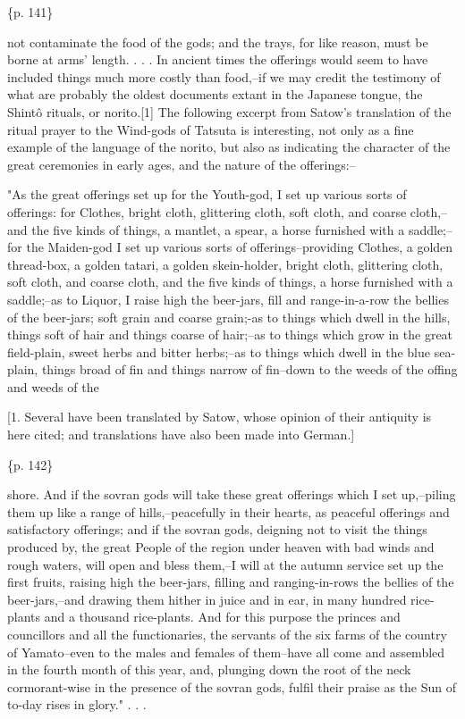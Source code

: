 \{p. 141\}

not contaminate the food of the gods; and the trays, for like reason, must be borne at arms' length. . . . In ancient times the offerings would seem to have included things much more costly than food,--if we may credit the testimony of what are probably the oldest documents extant in the Japanese tongue, the Shintô rituals, or norito.[1] The following excerpt from Satow's translation of the ritual prayer to the Wind-gods of Tatsuta is interesting, not only as a fine example of the language of the norito, but also as indicating the character of the great ceremonies in early ages, and the nature of the offerings:--

"As the great offerings set up for the Youth-god, I set up various sorts of offerings: for Clothes, bright cloth, glittering cloth, soft cloth, and coarse cloth,--and the five kinds of things, a mantlet, a spear, a horse furnished with a saddle;--for the Maiden-god I set up various sorts of offerings--providing Clothes, a golden thread-box, a golden tatari, a golden skein-holder, bright cloth, glittering cloth, soft cloth, and coarse cloth, and the five kinds of things, a horse furnished with a saddle;--as to Liquor, I raise high the beer-jars, fill and range-in-a-row the bellies of the beer-jars; soft grain and coarse grain;-as to things which dwell in the hills, things soft of hair and things coarse of hair;--as to things which grow in the great field-plain, sweet herbs and bitter herbs;--as to things which dwell in the blue sea-plain, things broad of fin and things narrow of fin--down to the weeds of the offing and weeds of the

[1. Several have been translated by Satow, whose opinion of their antiquity is here cited; and translations have also been made into German.]

\{p. 142\}

shore. And if the sovran gods will take these great offerings which I set up,--piling them up like a range of hills,--peacefully in their hearts, as peaceful offerings and satisfactory offerings; and if the sovran gods, deigning not to visit the things produced by, the great People of the region under heaven with bad winds and rough waters, will open and bless them,--I will at the autumn service set up the first fruits, raising high the beer-jars, filling and ranging-in-rows the bellies of the beer-jars,--and drawing them hither in juice and in ear, in many hundred rice-plants and a thousand rice-plants. And for this purpose the princes and councillors and all the functionaries, the servants of the six farms of the country of Yamato--even to the males and females of them--have all come and assembled in the fourth month of this year, and, plunging down the root of the neck cormorant-wise in the presence of the sovran gods, fulfil their praise as the Sun of to-day rises in glory." . . .

